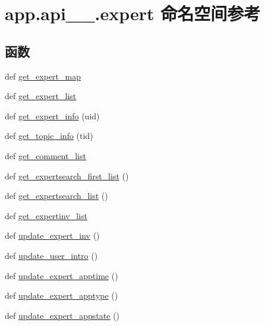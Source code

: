 \hypertarget{namespaceapp_1_1api__1__0_1_1expert}{}\section{app.\+api\+\_\+\_.\+expert 命名空间参考}
\label{namespaceapp_1_1api__1__0_1_1expert}
\subsection*{函数}
\begin{DoxyCompactItemize}
\item 
def \hyperlink{namespaceapp_1_1api__1__0_1_1expert_ad67d0db8aad4a90a70ad5af337076f99}{get\+\_\+expert\+\_\+map}
\item 
def \hyperlink{namespaceapp_1_1api__1__0_1_1expert_a2aef8e3a305172d5fc2ec7ebd4386c14}{get\+\_\+expert\+\_\+list}
\item 
def \hyperlink{namespaceapp_1_1api__1__0_1_1expert_aeb7e02e987f3951d72f2df8a8de62613}{get\+\_\+expert\+\_\+info} (uid)
\item 
def \hyperlink{namespaceapp_1_1api__1__0_1_1expert_acf792e35e5b48243540dbac094c1628c}{get\+\_\+topic\+\_\+info} (tid)
\item 
def \hyperlink{namespaceapp_1_1api__1__0_1_1expert_a90c29c044f8ce0bb1d8c550e73b9a143}{get\+\_\+comment\+\_\+list}
\item 
def \hyperlink{namespaceapp_1_1api__1__0_1_1expert_adbc903e06dc21ff52496dde9502a8d32}{get\+\_\+expertsearch\+\_\+first\+\_\+list} ()
\item 
def \hyperlink{namespaceapp_1_1api__1__0_1_1expert_a231f17add6f77504a34b2471ec0d89fc}{get\+\_\+expertsearch\+\_\+list} ()
\item 
def \hyperlink{namespaceapp_1_1api__1__0_1_1expert_ac5a2e095710d8463a6208c8fe679c0c3}{get\+\_\+expertinv\+\_\+list}
\item 
def \hyperlink{namespaceapp_1_1api__1__0_1_1expert_a6bcc721401e0183a61d6dca2ce7e5cd7}{update\+\_\+expert\+\_\+inv} ()
\item 
def \hyperlink{namespaceapp_1_1api__1__0_1_1expert_aba553c448587fe1245d73fb42bf47741}{update\+\_\+user\+\_\+intro} ()
\item 
def \hyperlink{namespaceapp_1_1api__1__0_1_1expert_af76dad7f4f1c0ff33d1487959ea61b1d}{update\+\_\+expert\+\_\+apptime} ()
\item 
def \hyperlink{namespaceapp_1_1api__1__0_1_1expert_a43304a981a0b995362481e9e626e5998}{update\+\_\+expert\+\_\+apptype} ()
\item 
def \hyperlink{namespaceapp_1_1api__1__0_1_1expert_a365c94a73099856dc8caad457e6750b1}{update\+\_\+expert\+\_\+appstate} ()
\end{DoxyCompactItemize}



